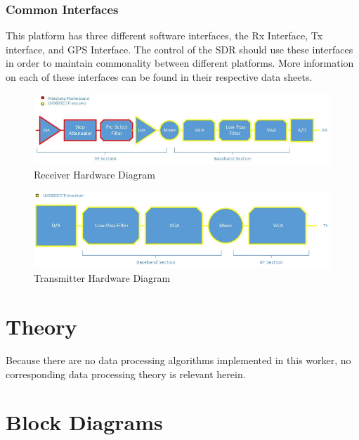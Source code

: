 \documentclass{article}
\begin{document}
\begin{flushleft}
\subsubsection*{Common Interfaces}
This platform has three different software interfaces, the Rx Interface, Tx interface, and GPS Interface.  The control of the SDR should use these interfaces in order to maintain commonality between different platforms.  More information on each of these interfaces can be found in their respective data sheets.

\begin{figure}[ht]
	\centerline{\includegraphics[scale=0.6]{matchstiq_FE_RX_HW}}
	\caption{Receiver Hardware Diagram}
	\label{fig:rx}
\end{figure}
\begin{figure}[ht]
	\centerline{\includegraphics[scale=0.6]{matchstiq_FE_TX_HW}}
	\caption{Transmitter Hardware Diagram}
	\label{fig:tx}
\end{figure}

\end{flushleft}
\pagebreak

\section*{Theory}
Because there are no data processing algorithms implemented in this worker, no corresponding data processing theory is relevant herein.

\section*{Block Diagrams}
\end{document}
